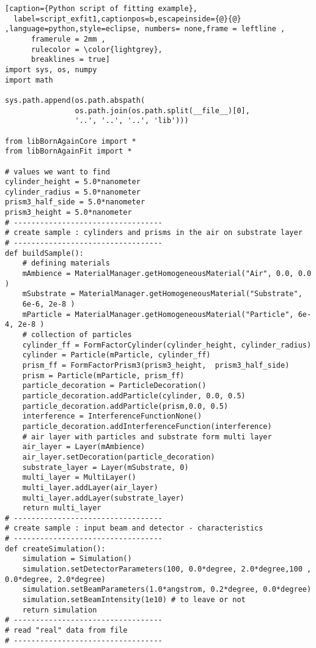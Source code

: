 \begin{lstlisting}[caption={Python script of fitting example},
  label=script_exfit1,captionpos=b,escapeinside={@}{@} ,language=python,style=eclipse, numbers= none,frame = leftline ,
      framerule = 2mm ,
      rulecolor = \color{lightgrey},
      breaklines = true]
import sys, os, numpy
import math 

sys.path.append(os.path.abspath(
                os.path.join(os.path.split(__file__)[0],
                '..', '..', '..', 'lib')))

from libBornAgainCore import *
from libBornAgainFit import *

# values we want to find
cylinder_height = 5.0*nanometer
cylinder_radius = 5.0*nanometer
prism3_half_side = 5.0*nanometer
prism3_height = 5.0*nanometer
# ----------------------------------
# create sample : cylinders and prisms in the air on substrate layer
# ----------------------------------
def buildSample(): 
    # defining materials
    mAmbience = MaterialManager.getHomogeneousMaterial("Air", 0.0, 0.0 )
    mSubstrate = MaterialManager.getHomogeneousMaterial("Substrate",
    6e-6, 2e-8 )
    mParticle = MaterialManager.getHomogeneousMaterial("Particle", 6e-4, 2e-8 )
    # collection of particles
    cylinder_ff = FormFactorCylinder(cylinder_height, cylinder_radius)
    cylinder = Particle(mParticle, cylinder_ff)
    prism_ff = FormFactorPrism3(prism3_height,  prism3_half_side)
    prism = Particle(mParticle, prism_ff)
    particle_decoration = ParticleDecoration()
    particle_decoration.addParticle(cylinder, 0.0, 0.5)
    particle_decoration.addParticle(prism,0.0, 0.5)  
    interference = InterferenceFunctionNone()
    particle_decoration.addInterferenceFunction(interference)
    # air layer with particles and substrate form multi layer
    air_layer = Layer(mAmbience)
    air_layer.setDecoration(particle_decoration)
    substrate_layer = Layer(mSubstrate, 0)
    multi_layer = MultiLayer()
    multi_layer.addLayer(air_layer)
    multi_layer.addLayer(substrate_layer)
    return multi_layer
# ----------------------------------
# create sample : input beam and detector - characteristics
# ----------------------------------
def createSimulation():
    simulation = Simulation()
    simulation.setDetectorParameters(100, 0.0*degree, 2.0*degree,100 , 0.0*degree, 2.0*degree)
    simulation.setBeamParameters(1.0*angstrom, 0.2*degree, 0.0*degree)
    simulation.setBeamIntensity(1e10) # to leave or not
    return simulation
# ----------------------------------
# read "real" data from file
# ----------------------------------

\end{lstlisting}
